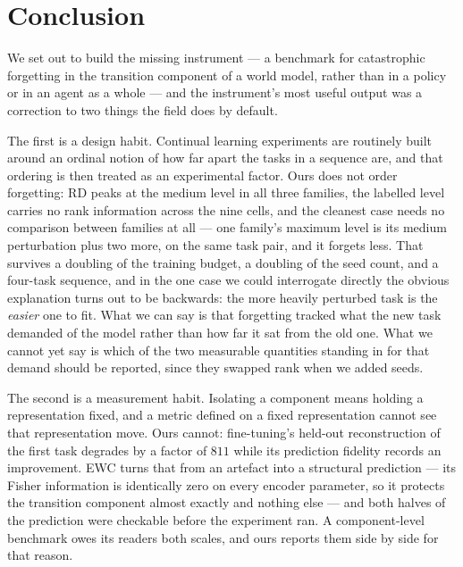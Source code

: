 %

\section{Conclusion}
\label{sec:conclusion}

We set out to build the missing instrument --- a benchmark for catastrophic
forgetting in the transition component of a world model, rather than in a
policy or in an agent as a whole --- and the instrument's most useful output was
a correction to two things the field does by default.

The first is a design habit. Continual learning experiments are routinely built
around an ordinal notion of how far apart the tasks in a sequence are, and that
ordering is then treated as an experimental factor. Ours does not order
forgetting: RD peaks at the medium level in all three families, the labelled
level carries no rank information across the nine cells, and the cleanest case
needs no comparison between families at all --- one family's maximum level is
its medium perturbation plus two more, on the same task pair, and it forgets
less. That survives a doubling of the training budget, a doubling of the seed
count, and a four-task sequence, and in the one case we could interrogate
directly the obvious explanation turns out to be backwards: the more heavily
perturbed task is the \emph{easier} one to fit. What we can say is that
forgetting tracked what the new task demanded of the model rather than how far
it sat from the old one. What we cannot yet say is which of the two measurable
quantities standing in for that demand should be reported, since they swapped
rank when we added seeds.

The second is a measurement habit. Isolating a component means holding a
representation fixed, and a metric defined on a fixed representation cannot see
that representation move. Ours cannot: fine-tuning's held-out reconstruction of
the first task degrades by a factor of $811$ while its prediction fidelity
records an improvement. EWC turns that from an artefact into a structural
prediction --- its Fisher information is identically zero on every encoder
parameter, so it protects the transition component almost exactly and nothing
else --- and both halves of the prediction were checkable before the experiment
ran. A component-level benchmark owes its readers both scales, and ours reports
them side by side for that reason.

